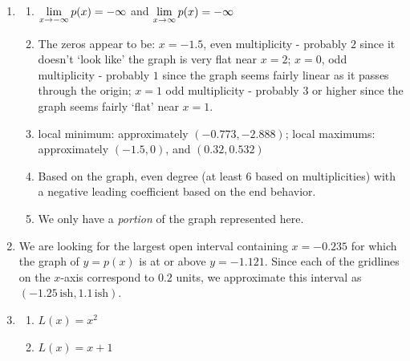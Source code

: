 \begin{enumerate}
\item \begin{enumerate}

\item   $\displaystyle{\lim_{x \rightarrow - \infty} p(x)  = -\infty}$  and $\displaystyle{\lim_{x \rightarrow  \infty} p(x)  = -\infty}$

\item The zeros appear to be: $x=-1.5$, even multiplicity - probably $2$ since it doesn't `look like' the graph is very flat near $x = 2$;  $x=0$, odd multiplicity - probably $1$ since the graph seems fairly linear as it passes through the origin;  $x=1$ odd multiplicity - probably $3$ or higher since the graph seems fairly `flat' near $x = 1$.

\item  local minimum:  approximately $(-0.773, -2.888)$;  local maximums:  approximately $(-1.5,0)$, and $(0.32, 0.532)$

\item  Based on the graph, even degree (at least $6$ based on multiplicities) with a negative leading coefficient based on the end behavior.

\item  We only have a \textit{portion} of the graph represented here.

\end{enumerate}

\addtocounter{enumi}{1}

\item We are looking for the largest open interval containing $x = -0.235$ for which the graph of $y = p(x)$ is at or above $y=-1.121$.  Since each of the gridlines on the $x$-axis correspond to $0.2$ units, we approximate this interval as  $(-1.25 \, \text{ish}, 1.1 \, \text{ish})$.

\addtocounter{enumi}{4}

\item 

\begin{multicols}{2}
\begin{enumerate} \addtocounter{enumii}{2} 
\item $L(x) = x^2$


\item $L(x) = x+1$

\end{enumerate}
\end{multicols}

\end{enumerate}
